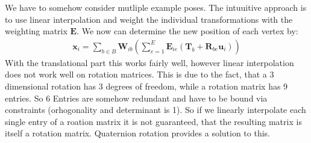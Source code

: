 \documentclass[
	11pt, 
	DIV10,
	a4paper, 
	oneside, 
	headings=normal, 
	captions=tableheading,
	final, 
	numbers=noenddot
]{scrartcl}
\begin{document}
We have to somehow consider mutliple example poses. The intuuitive approach is to use linear interpolation and weight the individual transformations with the weighting matrix $\bm{E}$. We now can determine the new position of each vertex by:
\begin{align}
\bm{x}_i = \sum_{b\in B}\bm{W}_{ib}\left( \sum_{e=1}^{E} \bm{E}_{ie} \left( \bm{T}_b + \bm{R}_{be} \bm{u}_i \right) \right) 
\end{align}
With the translational part this works fairly well, however linear interpolation does not work well on rotation matrices. This is due to the fact, that a 3 dimensional rotation has 3 degrees of freedom, while a rotation matrix has 9 entries. So 6 Entries are somehow redundant and have to be bound via constraints (orhogonality and determinant is 1). So if we linearly interpolate each single entry of a roation matrix it is not guaranteed, that the resulting matrix is itself a rotation matrix. Quaternion rotation provides a solution to this.
\end{document}
